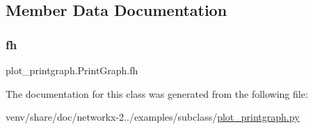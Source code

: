 \subsection{Member Data Documentation}
\mbox{\label{classplot__printgraph_1_1PrintGraph_aebbba8f38418150bb2cea99a08ee7a11}} 
\subsubsection{\texorpdfstring{fh}{fh}}
{\footnotesize\ttfamily plot\+\_\+printgraph.\+Print\+Graph.\+fh}



The documentation for this class was generated from the following file\+:\begin{DoxyCompactItemize}
\item 
venv/share/doc/networkx-\/2../examples/subclass/\hyperlink{plot__printgraph_8py}{plot\+\_\+printgraph.\+py}\end{DoxyCompactItemize}
